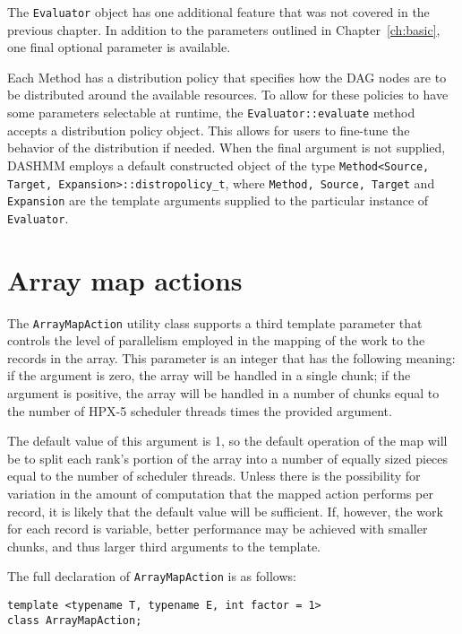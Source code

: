 The \texttt{Evaluator} object has one additional feature that was not
covered in the previous chapter. In addition to the parameters outlined
in Chapter~\ref{ch:basic}, one final optional parameter is available.

Each Method has a distribution policy that specifies how the DAG nodes are
to be distributed around the available resources. To allow for these policies
to have some parameters selectable at runtime, the
\texttt{Evaluator::evaluate} method accepts a distribution policy object.
This allows for users to fine-tune the behavior of the distribution if needed.
When the final argument is not supplied, DASHMM employs a default constructed
object of the type \texttt{Method<Source, Target, Expansion>::distropolicy\_t},
where \texttt{Method, Source, Target} and \texttt{Expansion} are the template
arguments supplied to the particular instance of \texttt{Evaluator}.



\section{Array map actions}

The \texttt{ArrayMapAction} utility class supports a third template parameter
that controls the level of parallelism employed in the mapping of the work
to the records in the array. This parameter is an integer that has the
following meaning: if the argument is zero, the array will be handled in a
single chunk; if the argument is positive, the array will be handled in a number
of chunks equal to the number of HPX-5 scheduler threads times the provided
argument.

The default value of this argument is 1, so the default operation of
the map will be to split each rank's portion of the array into a number of
equally sized pieces equal to the number of scheduler threads. Unless there is
the possibility for variation in the amount of computation that the mapped
action performs per record, it is likely that the default value will be
sufficient. If, however, the work for each record is variable, better
performance may be achieved with smaller chunks, and thus larger third arguments
to the template.

The full declaration of \texttt{ArrayMapAction} is as follows:

\begin{verbatim}
template <typename T, typename E, int factor = 1>
class ArrayMapAction;
\end{verbatim}



